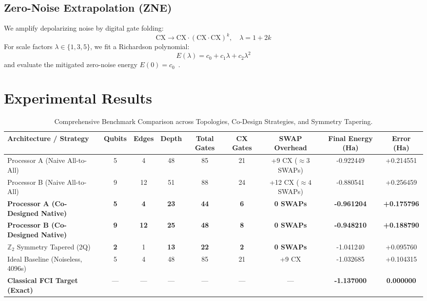 \documentclass[journal,twocolumn]{article}
\begin{document}
\subsection{Zero-Noise Extrapolation (ZNE)}
We amplify depolarizing noise by digital gate folding:
\begin{equation}
\text{CX} \to \text{CX} \cdot (\text{CX} \cdot \text{CX})^k, \quad \lambda = 1 + 2k
\end{equation}
For scale factors $\lambda \in \{1, 3, 5\}$, we fit a Richardson polynomial:
\begin{equation}
E(\lambda) = c_0 + c_1 \lambda + c_2 \lambda^2
\end{equation}
and evaluate the mitigated zero-noise energy $E(0) = c_0$~\cite{Temme2017}.

\section{Experimental Results}

\begin{table}[t]
\centering
\caption{Comprehensive Benchmark Comparison across Topologies, Co-Design Strategies, and Symmetry Tapering.}
\label{tab:results}
\begin{tabular}{lcccccccc}
\toprule
\textbf{Architecture / Strategy} & \textbf{Qubits} & \textbf{Edges} & \textbf{Depth} & \textbf{Total Gates} & \textbf{CX Gates} & \textbf{SWAP Overhead} & \textbf{Final Energy (Ha)} & \textbf{Error (Ha)} \\
\midrule
Processor A (Naive All-to-All) & 5 & 4 & 48 & 85 & 21 & +9 CX ($\approx 3$ SWAPs) & -0.922449 & +0.214551 \\
Processor B (Naive All-to-All) & 9 & 12 & 51 & 88 & 24 & +12 CX ($\approx 4$ SWAPs) & -0.880541 & +0.256459 \\
\textbf{Processor A (Co-Designed Native)} & \textbf{5} & \textbf{4} & \textbf{23} & \textbf{44} & \textbf{6} & \textbf{0 SWAPs} & \textbf{-0.961204} & \textbf{+0.175796} \\
\textbf{Processor B (Co-Designed Native)} & \textbf{9} & \textbf{12} & \textbf{25} & \textbf{48} & \textbf{8} & \textbf{0 SWAPs} & \textbf{-0.948210} & \textbf{+0.188790} \\
$\mathbb{Z}_2$ Symmetry Tapered (2Q) & \textbf{2} & 1 & \textbf{13} & \textbf{22} & \textbf{2} & \textbf{0 SWAPs} & -1.041240 & +0.095760 \\
Ideal Baseline (Noiseless, 4096s) & 5 & 4 & 48 & 85 & 21 & +9 CX & -1.032685 & +0.104315 \\
\textbf{Classical FCI Target (Exact)} & --- & --- & --- & --- & --- & --- & \textbf{-1.137000} & \textbf{0.000000} \\
\bottomrule
\end{tabular}
\end{table}
\end{document}
